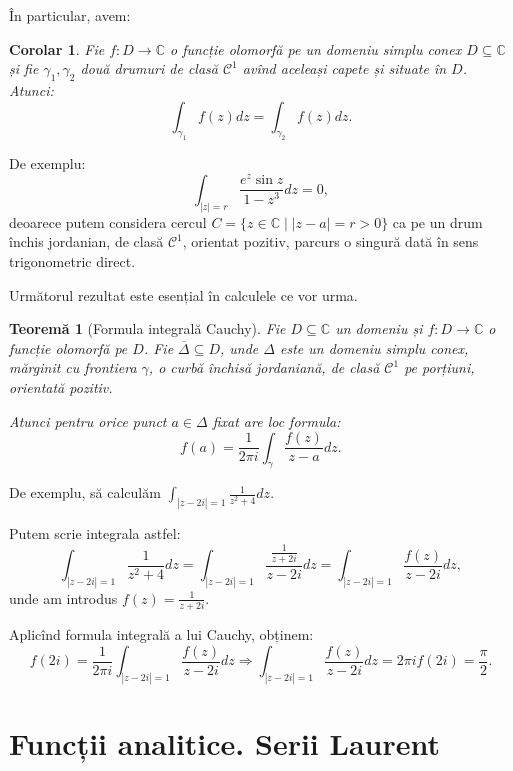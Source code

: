 \documentclass[12pt,a4paper]{article}
\newcommand\kal{\mathcal}
\newcommand\ds{\displaystyle}
\newcommand\seq{\subseteq}
\newcommand\CC{\mathbb{C}}
\theoremstyle{dotless}
\newtheorem{theorem}{Teorem\u{a}}
\newtheorem{corollary}{Corolar}
\theoremstyle{dotlessdr}
\begin{document}
În particular, avem:

\begin{corollary}\label{cor:cauchy}
  Fie $ f : D \to \CC $ o funcție olomorfă pe un domeniu simplu conex $ D \seq \CC $
  și fie $ \gamma_1, \gamma_2 $ două drumuri de clasă $ \kal{C}^1 $ avînd aceleași
  capete și situate în $ D $. Atunci:
  \[
    \int_{\gamma_1} f(z) dz = \int_{\gamma_2} f(z) dz.
  \]
\end{corollary}

De exemplu:
\[
  \int_{|z| = r} \frac{e^z \sin z}{1 - z^3} dz = 0,
\]
deoarece putem considera cercul $ C = \{z \in \CC \mid |z - a| = r > 0 \} $ ca pe
un drum închis jordanian, de clasă $ \kal{C}^1 $, orientat pozitiv, parcurs o
singură dată în sens trigonometric direct.

\vspace{1cm}

Următorul rezultat este esențial în calculele ce vor urma.

\begin{theorem}[Formula integrală Cauchy]\label{thm:cauchy-int}
  Fie $ D \seq \CC $ un domeniu și $ f : D \to \CC $ o funcție olomorfă pe $ D $.
  Fie $ \overline{\Delta} \seq D $, unde $ \Delta $ este un domeniu simplu conex,
  mărginit cu frontiera $ \gamma $, o curbă închisă jordaniană, de clasă $ \kal{C}^1 $
  pe porțiuni, orientată pozitiv.

  Atunci pentru orice punct $ a \in \Delta $ fixat are loc formula:
  \[
    f(a) = \frac{1}{2\pi i} \int_\gamma \frac{f(z)}{z - a} dz.
  \]
\end{theorem}

De exemplu, să calculăm $ \ds\int_{|z - 2i| = 1} \frac{1}{z^2 + 4} dz $.

Putem scrie integrala astfel:
\[
  \int_{|z - 2i| = 1} \frac{1}{z^2 + 4} dz = %
  \int_{|z - 2i| = 1} \frac{\frac{1}{z + 2i}}{z - 2i} dz = %
  \int_{|z - 2i| = 1} \frac{f(z)}{z - 2i} dz,
\]
unde am introdus $ f(z) = \frac{1}{z + 2i} $.

Aplicînd formula integrală a lui Cauchy, obținem:
\[
  f(2i) = \frac{1}{2 \pi i} \int_{|z - 2i| = 1} \frac{f(z)}{z - 2i} dz \Rightarrow %
  \int_{|z - 2i| = 1} \frac{f(z)}{z - 2i} dz = 2 \pi i f(2i) = \frac{\pi}{2}.
\]


\section*{Funcții analitice. Serii Laurent}
\end{document}
